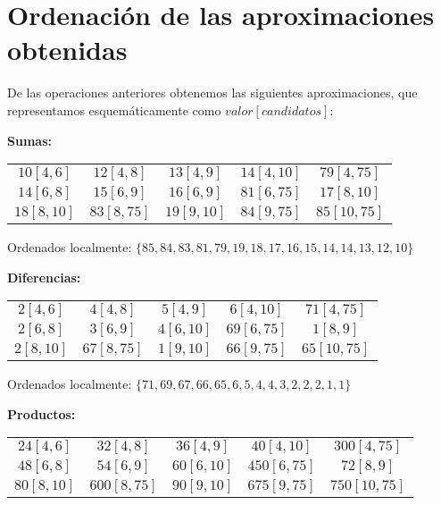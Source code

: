 \pagebreak

\section{Ordenación de las aproximaciones obtenidas}

De las operaciones anteriores obtenemos las siguientes aproximaciones, que representamos esquemáticamente como $valor[candidatos]$:

\textbf{Sumas:}

\begin{center}
\begin{tabular}{c c c c c}
 $10[4,6]$ &  $12[4,8]$ &  $13[4,9]$ & $14[4,10]$ &  $79[4,75]$ \\
 $14[6,8]$ &  $15[6,9]$ &  $16[6,9]$ & $81[6,75]$ &  $17[8,10]$ \\
$18[8,10]$ & $83[8,75]$ & $19[9,10]$ & $84[9,75]$ & $85[10,75]$ \\
\end{tabular}
\end{center}

Ordenados localmente: $\{85,84,83,81,79,19,18,17,16,15,14,14,13,12,10\}$

\textbf{Diferencias:}

\begin{center}
\begin{tabular}{c c c c c}
$2[4,6]$  & $4[4,8]$   & $5[4,9]$  & $6[4,10]$  & $71[4,75]$  \\
$2[6,8]$  & $3[6,9]$   & $4[6,10]$ & $69[6,75]$ & $1[8,9]$    \\
$2[8,10]$ & $67[8,75]$ & $1[9,10]$ & $66[9,75]$ & $65[10,75]$ \\
\end{tabular}
\end{center}

Ordenados localmente: $\{71,69,67,66,65,6,5,4,4,3,2,2,2,1,1\}$

\textbf{Productos:}

\begin{center}
\begin{tabular}{c c c c c}
$24[4,6]$  & $32[4,8]$   & $36[4,9]$  & $40[4,10]$  & $300[4,75]$  \\
$48[6,8]$  & $54[6,9]$   & $60[6,10]$ & $450[6,75]$ & $72[8,9]$    \\
$80[8,10]$ & $600[8,75]$ & $90[9,10]$ & $675[9,75]$ & $750[10,75]$ \\
\end{tabular}
\end{center}

